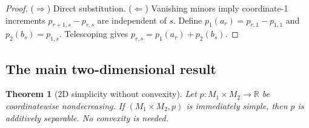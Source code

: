 \documentclass[11pt]{article}
\newtheorem{theorem}{Theorem}[section]
\newcommand{\R}{\mathbb{R}}
\begin{document}
\begin{proof}
($\Rightarrow$) Direct substitution.  ($\Leftarrow$) Vanishing minors
imply coordinate-1 increments $p_{r+1,s} - p_{r,s}$ are independent
of $s$.  Define $p_1(a_r) = p_{r,1} - p_{1,1}$ and $p_2(b_s) = p_{1,s}$.
Telescoping gives $p_{r,s} = p_1(a_r) + p_2(b_s)$.
\end{proof}

\subsection{The main two-dimensional result}

\begin{theorem}[2D simplicity without convexity]%
\label{thm:2d-no-convex}
Let $p \colon M_1 \times M_2 \to \R$ be coordinatewise nondecreasing.
If $(M_1 \times M_2, p)$ is immediately simple, then $p$ is additively
separable.  No convexity is needed.
\end{theorem}
\end{document}
